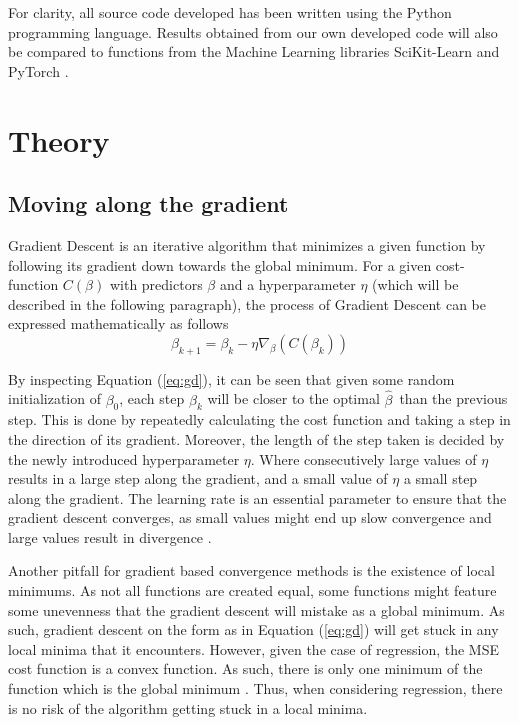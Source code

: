 \documentclass[11pt, a4paper]{article}
\begin{document}
For clarity, all source code developed has been written using the Python programming language. Results obtained from our own developed code will also be compared to functions from the Machine Learning libraries SciKit-Learn \cite{scikit-learn} and PyTorch \cite{paszke2019}.

\section*{Theory}
\subsection*{Moving along the gradient}
Gradient Descent is an iterative algorithm that minimizes a given function by following its gradient down towards the global minimum. For a given cost-function $C(\beta)$ with predictors $\beta$ and a hyperparameter $\eta$ (which will be described in the following paragraph), the process of Gradient Descent can be expressed mathematically as follows
\begin{equation}
  \label{eq:gd}
  \beta_{k+1} = \beta_k - \eta\nabla_\beta\left(C(\beta_k)\right)
\end{equation}

By inspecting Equation (\ref{eq:gd}), it can be seen that given some random initialization of $\beta_0$, each step $\beta_k$ will be closer to the optimal $\hat{\beta}$ than the previous step. This is done by repeatedly calculating the cost function and taking a step in the direction of its gradient. Moreover, the length of the step taken is decided by the newly introduced hyperparameter $\eta$. Where consecutively large values of $\eta$ results in a large step along the gradient, and a small value of $\eta$ a small step along the gradient. The learning rate is an essential parameter to ensure that the gradient descent converges, as small values might end up slow convergence and large values result in divergence \cite{Geron2019}. 

Another pitfall for gradient based convergence methods is the existence of local minimums. As not all functions are created equal, some functions might feature some unevenness that the gradient descent will mistake as a global minimum. As such, gradient descent on the form as in Equation (\ref{eq:gd}) will get stuck in any local minima that it encounters. However, given the case of regression, the MSE cost function is a convex function. As such, there is only one minimum of the function which is the global minimum \cite{Geron2019}. Thus, when considering regression, there is no risk of the algorithm getting stuck in a local minima.
\end{document}
